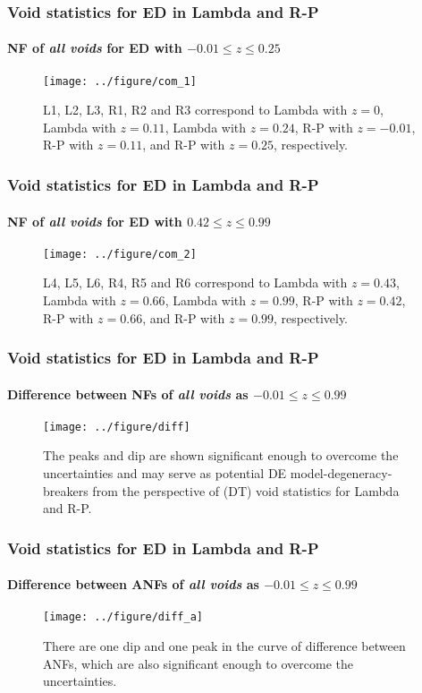 \documentclass{beamer}
\newtheorem{Narrow down the analysis}{Narrow down the analysis}
\begin{document}
\begin{frame}
	\frametitle{Void statistics for ED in Lambda and R-P}
	\framesubtitle{NF of \textit{all voids} for ED with $-0.01\leq z\leq 0.25$}
	\pause 
	\begin{figure}
\centering
\texttt{[image: ../figure/com\_1]}
\caption{L1, L2, L3, R1, R2 and R3 correspond to Lambda with $z=0$, Lambda with $z=0.11$, Lambda with $z=0.24$, R-P with $z=-0.01$, R-P with $z=0.11$, and R-P with $z=0.25$, respectively.} 
\label{19}
\end{figure}
\end{frame}

\begin{frame}
	\frametitle{Void statistics for ED in Lambda and R-P}
	\framesubtitle{NF of \textit{all voids} for ED with $0.42\leq z\leq 0.99$}
	\pause 
	\begin{figure}
\centering
\texttt{[image: ../figure/com\_2]}
\caption{L4, L5, L6, R4, R5 and R6 correspond to Lambda with $z=0.43$, Lambda with $z=0.66$, Lambda with $z=0.99$, R-P with $z=0.42$, R-P with $z=0.66$, and R-P with $z=0.99$, respectively. }
\label{20}
\end{figure}
\end{frame}

\begin{frame}
	\frametitle{Void statistics for ED in Lambda and R-P}
	\framesubtitle{Difference between NFs of \textit{all voids} as $-0.01\leq z\leq 0.99$}
	\pause 
	\begin{figure}
\centering
\texttt{[image: ../figure/diff]}
\caption{The peaks and dip are shown significant enough to overcome the uncertainties and may serve as potential DE model-degeneracy-breakers from the perspective of (DT) void statistics for Lambda and R-P.}
\label{21}
\end{figure}
\end{frame}

\begin{frame}
	\frametitle{Void statistics for ED in Lambda and R-P}
	\framesubtitle{Difference between ANFs of \textit{all voids} as $-0.01\leq z\leq 0.99$}
	\pause 
	\begin{figure}
\centering
\texttt{[image: ../figure/diff\_a]}
\caption{There are one dip and one peak in the curve of difference between ANFs, which are also significant enough to overcome the uncertainties.}
\label{23}
\end{figure}
\end{frame}
\end{document}
